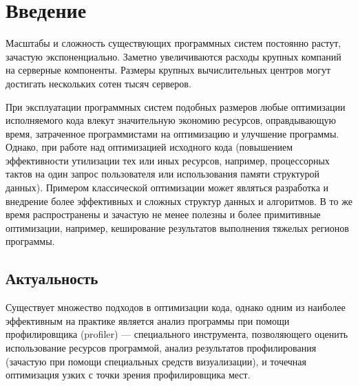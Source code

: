 \section{Введение}

\epigraph{
}{
}

Масштабы и сложность существующих программных систем постоянно растут, зачастую экспоненциально.
Заметно увеличиваются расходы крупных компаний на серверные компоненты.
Размеры крупных вычислительных центров могут достигать нескольких сотен тысяч серверов.

При эксплуатации программных систем подобных размеров любые оптимизации исполняемого кода влекут значительную экономию ресурсов, оправдывающую время, затраченное программистами на оптимизацию и улучшение программы.
Однако, при работе над оптимизацией исходного кода (повышением эффективности утилизации тех или иных ресурсов, например, процессорных тактов на один запрос пользователя или использования памяти структурой данных).
Примером классической оптимизации может являться разработка и внедрение более эффективных и сложных структур данных и алгоритмов.
В то же время распространены и зачастую не менее полезны и более примитивные оптимизации, например, кеширование результатов выполнения тяжелых регионов программы.

\subsection{Актуальность}
Существует множество подходов в оптимизации кода, однако одним из наиболее эффективным на практике
является анализ программы при помощи профилировщика (profiler) --- специального инструмента, позволяющего оценить использование ресурсов программой, анализ результатов профилирования (зачастую при помощи специальных средств визуализации), и точечная оптимизация узких с точки зрения профилировщика мест.

